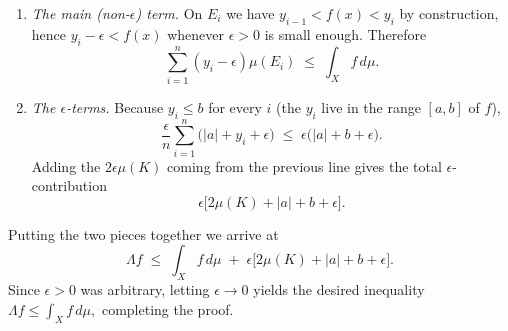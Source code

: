 \documentclass[12pt]{article}
\theoremstyle{definition} %
\theoremstyle{plain} %
\begin{document}
\begin{enumerate}
\item\emph{The main (non-$\epsilon$) term.}
      On $E_i$ we have
      \(
        y_{i-1}<f(x)<y_i
      \)
      by construction, hence
      \(
        y_i-\epsilon<f(x)
      \)
      whenever $\epsilon>0$ is small enough.  Therefore
      \[
          \sum_{i=1}^{n}(y_i-\epsilon)\mu(E_i)
          \;\le\;
          \int_{X}f\,d\mu.
      \]

\item\emph{The $\epsilon$-terms.}
      Because $y_i\le b$ for every $i$ (the $y_i$ live in the range
      $[a,b]$ of $f$),
      \[
          \frac{\epsilon}{n}\sum_{i=1}^{n}\bigl(|a|+y_i+\epsilon\bigr)
          \;\le\;
          \epsilon\bigl(|a|+b+\epsilon\bigr).
      \]
      Adding the $2\epsilon\mu(K)$ coming from the previous line gives
      the total $\epsilon$-contribution
      \[
         \epsilon\bigl[2\mu(K)+|a|+b+\epsilon\bigr].
      \]
\end{enumerate}

Putting the two pieces together we arrive at
\[
   \Lambda f
   \;\le\;
   \int_{X}f\,d\mu
   \;+\;
   \epsilon\bigl[2\mu(K)+|a|+b+\epsilon\bigr].
\]
Since $\epsilon>0$ was arbitrary, letting $\epsilon\to0$ yields the
desired inequality
\(
  \Lambda f\le\int_{X}f\,d\mu,
\)
completing the proof.
\end{document}
